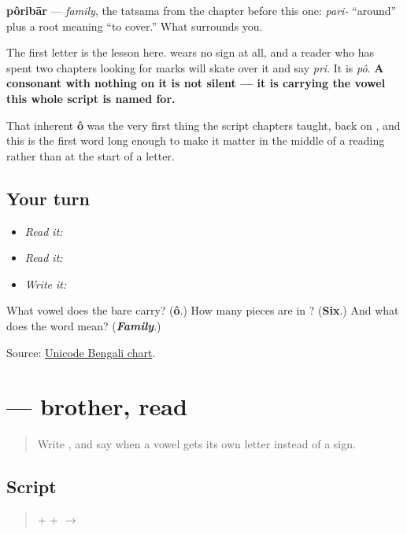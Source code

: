 \textbf{pôribār} — \emph{family}, the tatsama from the chapter before this one: \emph{pari-} \textquotedblleft{}around\textquotedblright{} plus a root meaning \textquotedblleft{}to cover.\textquotedblright{} What surrounds you.

The first letter is the lesson here. \textbf{} wears no sign at all, and a reader who has spent two chapters looking for marks will skate over it and say \emph{pri}. It is \emph{pô}. \textbf{A consonant with nothing on it is not silent — it is carrying the vowel this whole script is named for.}

That inherent \textbf{ô} was the very first thing the script chapters taught, back on \textbf{}, and this is the first word long enough to make it matter in the middle of a reading rather than at the start of a letter.

\subsection*{Your turn}
\begin{itemize}
\raggedright
  \item \emph{Read it:} 
  \item \emph{Read it:} 
  \item \emph{Write it:} 
\end{itemize}

\begin{tcolorbox}[breakable,colback=teal!4,colframe=teal!35!black,title={Before you move on}]
What vowel does the bare \textbf{} carry? (\textbf{ô}.) How many pieces are in \textbf{}? (\textbf{Six}.) And what does the word mean? (\emph{\textbf{Family}}.)

Source: \href{https://www.unicode.org/charts/PDF/U0980.pdf}{Unicode Bengali chart}.
\end{tcolorbox}
\section[\texorpdfstring{\bn{ভাই} (bhāi)}{ভাই (bhāi)}]{ — brother, read}

\label{lesson:BN-W04-bhai-read}



\begin{quote}
Write \textbf{}, and say when a vowel gets its own letter instead of a sign.
\end{quote}

\subsection*{Script}
\begin{quote}
\textbf{} + \textbf{} + \textbf{} $\to$ \textbf{}
\end{quote}

